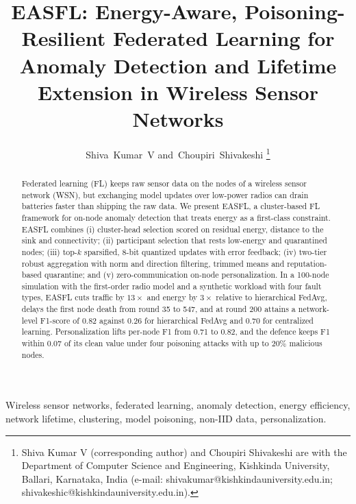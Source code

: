 \documentclass[journal]{IEEEtran}
\begin{document}
\title{EASFL: Energy-Aware, Poisoning-Resilient Federated Learning for Anomaly Detection and Lifetime Extension in Wireless Sensor Networks}

\author{Shiva~Kumar~V
and~Choupiri~Shivakeshi
\thanks{Shiva Kumar V (corresponding author) and Choupiri Shivakeshi are with the Department of Computer Science and Engineering, Kishkinda University, Ballari, Karnataka, India (e-mail: shivakumar@kishkindauniversity.edu.in; shivakeshic@kishkindauniversity.edu.in).}}


\maketitle

\begin{abstract}
Federated learning (FL) keeps raw sensor data on the nodes of a wireless sensor network (WSN), but exchanging model updates over low-power radios can drain batteries faster than shipping the raw data. We present EASFL, a cluster-based FL framework for on-node anomaly detection that treats energy as a first-class constraint. EASFL combines (i) cluster-head selection scored on residual energy, distance to the sink and connectivity; (ii) participant selection that rests low-energy and quarantined nodes; (iii) top-$k$ sparsified, 8-bit quantized updates with error feedback; (iv) two-tier robust aggregation with norm and direction filtering, trimmed means and reputation-based quarantine; and (v) zero-communication on-node personalization. In a 100-node simulation with the first-order radio model and a synthetic workload with four fault types, EASFL cuts traffic by $13\times$ and energy by $3\times$ relative to hierarchical FedAvg, delays the first node death from round 35 to 547, and at round 200 attains a network-level F1-score of 0.82 against 0.26 for hierarchical FedAvg and 0.70 for centralized learning. Personalization lifts per-node F1 from 0.71 to 0.82, and the defence keeps F1 within 0.07 of its clean value under four poisoning attacks with up to 20\% malicious nodes.
\end{abstract}

\begin{IEEEkeywords}
Wireless sensor networks, federated learning, anomaly detection, energy efficiency, network lifetime, clustering, model poisoning, non-IID data, personalization.
\end{IEEEkeywords}
\end{document}
